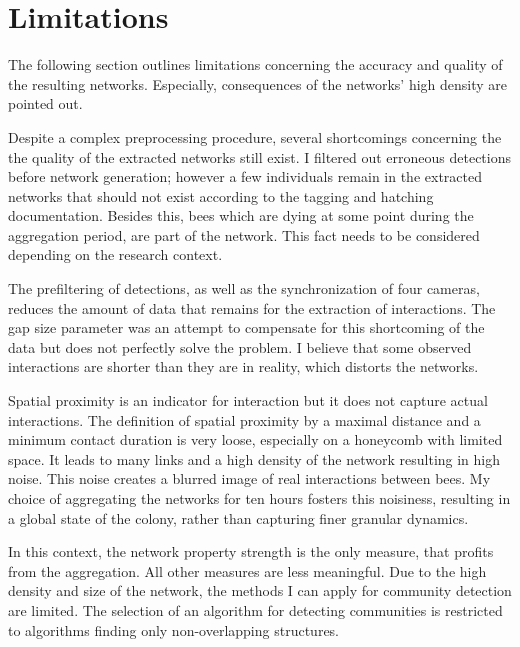 \section{Limitations}
The following section outlines limitations concerning the accuracy and quality of the resulting networks.
Especially, consequences of the networks' high density are pointed out.

Despite a complex preprocessing procedure, several shortcomings concerning the 
the quality of the extracted networks still exist.
I filtered out erroneous detections before network generation; however a few individuals remain in the extracted networks that should not exist according to the tagging and hatching documentation.
Besides this, bees which are dying at some point during the aggregation period, are part of the network.
This fact needs to be considered depending on the research context.

The prefiltering of detections, as well as the synchronization of four cameras, reduces the amount of data that remains for the extraction of interactions.
The gap size parameter was an attempt to compensate for this shortcoming of the data but does not perfectly solve the problem.
I believe that some observed interactions are shorter than they are in reality, which distorts the networks.

Spatial proximity is an indicator for interaction but it does not capture actual interactions.
The definition of spatial proximity by a maximal distance and a minimum contact duration is very loose, especially on a honeycomb with limited space.
It leads to many links and a high density of the network resulting in high noise.
This noise creates a blurred image of real interactions between bees.
My choice of aggregating the networks for ten hours fosters this noisiness, resulting in a global state of the colony, rather than capturing finer granular dynamics.

In this context, the network property strength is the only measure, that profits from the aggregation.
All other measures are less meaningful.
Due to the high density and size of the network, the methods I can apply for community detection are limited.
The selection of an algorithm for detecting communities is restricted to algorithms finding only non-overlapping structures.

